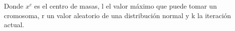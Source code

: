 Donde $x^c$ es el centro de masas, l el valor máximo que puede tomar un cromosoma, r un valor aleatorio de una distribución normal y k la iteración actual.




